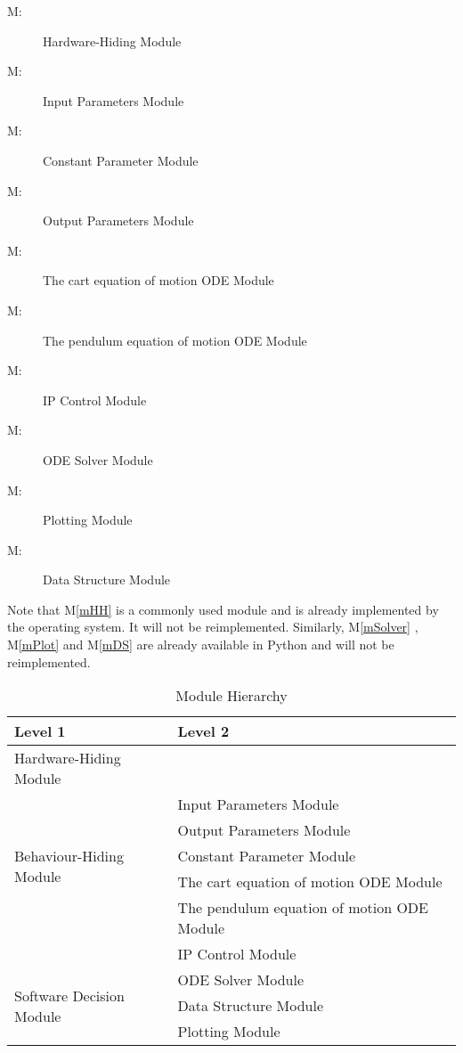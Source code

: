 \documentclass[12pt, titlepage]{article}
\newcounter{mnum}
\newcommand{\mthemnum}{M\themnum}
\newcommand{\mref}[1]{M\ref{#1}}
\begin{document}
\begin{description}
\item [ \mthemnum \label{mHH}:] Hardware-Hiding Module
\item [ \mthemnum \label{mParams}:] Input Parameters Module
\item [ \mthemnum \label{mCons}:] 
Constant Parameter Module
\item [ \mthemnum \label{mOutput}:] Output Parameters Module
\item [ \mthemnum \label{mODEC}:] The cart equation of motion ODE Module
\item [ \mthemnum \label{mODEP}:] The pendulum equation of motion ODE Module
\item [ \mthemnum \label{mControl}:] IP Control Module
\item [ \mthemnum \label{mSolver}:] ODE Solver Module
\item [ \mthemnum \label{mPlot}:] Plotting Module
\item [ \mthemnum \label{mDS}:]
Data Structure Module
\end{description}


Note that \mref{mHH} is a commonly used module and is already implemented by the operating system.  It will not be reimplemented.  Similarly, \mref{mSolver} , \mref{mPlot} and  \mref{mDS} are already available in Python and will not be reimplemented.



\begin{table}[h!]
\centering
\begin{tabular}{p{} p{}}
\toprule
\textbf{Level 1} & \textbf{Level 2}\\
\midrule

{Hardware-Hiding Module} & ~ \\
\midrule

\multirow{5}{0.3\textwidth}{Behaviour-Hiding Module} & Input Parameters Module\\
& Output Parameters Module\\
& Constant Parameter Module\\
&The cart equation of motion ODE Module\\
& The pendulum equation of motion ODE Module\\
& IP Control Module\\
\midrule

\multirow{3}{0.3\textwidth}{Software Decision Module} & {ODE Solver Module}\\
& Data Structure Module\\
& Plotting Module\\
\bottomrule

\end{tabular}
\caption{Module Hierarchy}
\label{TblMH}
\end{table}
\end{document}
